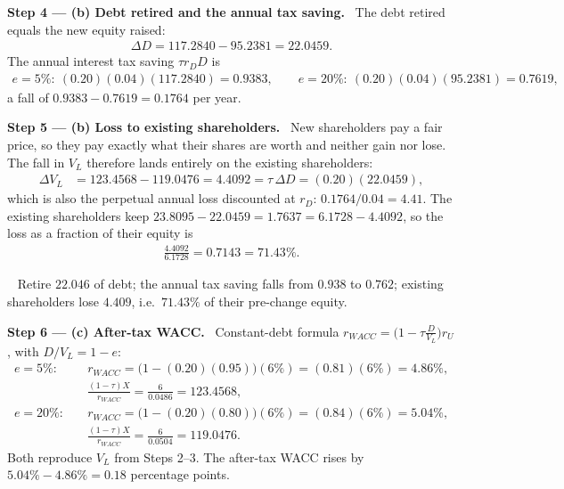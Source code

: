 \documentclass[11pt,a4paper]{article}
\numberwithin{equation}{section}
\newcommand{\step}[2]{\par\smallskip\noindent\textbf{Step #1 --- #2.}~}
\newcommand{\answer}[1]{\par\smallskip\noindent\fbox{\textbf{Answer #1.}}~}
\begin{document}
\step{4}{(b) Debt retired and the annual tax saving} The debt retired equals the new equity raised:
\begin{align}
  \Delta D=117.2840-95.2381=22.0459. \nonumber
\end{align}
The annual interest tax saving $\tau r_D D$ is
\begin{align}
  e=5\%:\ (0.20)(0.04)(117.2840)=0.9383,\qquad e=20\%:\ (0.20)(0.04)(95.2381)=0.7619, \nonumber
\end{align}
a fall of $0.9383-0.7619=0.1764$ per year.

\step{5}{(b) Loss to existing shareholders} New shareholders pay a fair price, so they pay exactly
what their shares are worth and neither gain nor lose. The fall in $V_L$ therefore lands entirely on the existing shareholders:
\begin{align}
  \Delta V_L &= 123.4568-119.0476=4.4092=\tau\,\Delta D=(0.20)(22.0459), \label{eq:17loss}
\end{align}
which is also the perpetual annual loss discounted at $r_D$: $0.1764/0.04=4.41$. The existing
shareholders keep $23.8095-22.0459=1.7637=6.1728-4.4092$, so the loss as a fraction of their equity is
\begin{align}
  \frac{4.4092}{6.1728}=0.7143=71.43\%. \nonumber
\end{align}
\answer{(b)} Retire $22.046$ of debt; the annual tax saving falls from $0.938$ to $0.762$; existing
shareholders lose $4.409$, i.e.\ $71.43\%$ of their pre-change equity.

\step{6}{(c) After-tax WACC} Constant-debt formula $r_{WACC}=\bigl(1-\tau\frac{D}{V_L}\bigr)r_U$, with $D/V_L=1-e$:
\begin{align}
  e=5\%:&\quad r_{WACC}=\bigl(1-(0.20)(0.95)\bigr)(6\%)=(0.81)(6\%)=4.86\%, \nonumber\\
        &\quad \frac{(1-\tau)X}{r_{WACC}}=\frac{6}{0.0486}=123.4568, \nonumber\\
  e=20\%:&\quad r_{WACC}=\bigl(1-(0.20)(0.80)\bigr)(6\%)=(0.84)(6\%)=5.04\%, \nonumber\\
        &\quad \frac{(1-\tau)X}{r_{WACC}}=\frac{6}{0.0504}=119.0476. \nonumber
\end{align}
Both reproduce $V_L$ from Steps 2--3. The after-tax WACC rises by $5.04\%-4.86\%=0.18$ percentage points.
\end{document}
